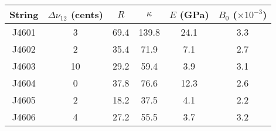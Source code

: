 \begin{tabular}{cccccc}
\toprule
String &  $\Delta \nu_{12}$ (cents) &  $R$ &  $\kappa$ &  $E$ (GPa) &  $B_0$ ($\times 10^{-3}$) \\
\midrule
 J4601 &                          3 & 69.4 &     139.8 &       24.1 &                       3.3 \\
 J4602 &                          2 & 35.4 &      71.9 &        7.1 &                       2.7 \\
 J4603 &                         10 & 29.2 &      59.4 &        3.9 &                       3.1 \\
 J4604 &                          0 & 37.8 &      76.6 &       12.3 &                       2.6 \\
 J4605 &                          2 & 18.2 &      37.5 &        4.1 &                       2.2 \\
 J4606 &                          4 & 27.2 &      55.5 &        3.7 &                       3.2 \\
\bottomrule
\end{tabular}

